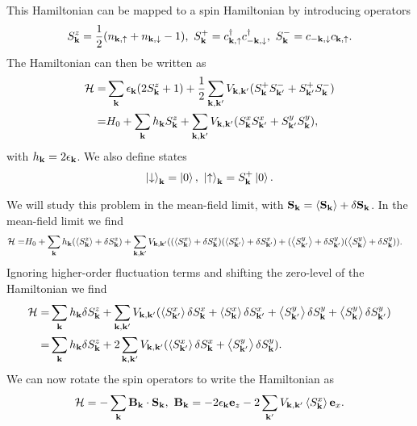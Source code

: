 This Hamiltonian can be mapped to a spin Hamiltonian by introducing operators
\begin{align*}
	S_{\vb{k}}^{z} = \frac{1}{2}(n_{\vb{k}, \uparrow} + n_{\vb{k}, \downarrow} - 1),\ S_{\vb{k}}^{+} = c_{\vb{k}, \uparrow}^{\dagger} c_{-\vb{k}, \downarrow}^{\dagger},\ S_{\vb{k}}^{-} = c_{-\vb{k}, \downarrow}c_{\vb{k}, \uparrow}.
\end{align*}
The Hamiltonian can then be written as
\begin{align*}
	\mathcal{H} =& \sum\limits_{\vb{k}}\epsilon_{\vb{k}}(2S_{\vb{k}}^{z} + 1) + \frac{1}{2}\sum\limits_{\vb{k}, \vb{k}^{\prime}}V_{\vb{k}, \vb{k}^{\prime}}(S_{\vb{k}}^{+}S_{\vb{k}^{\prime}}^{-} + S_{\vb{k}^{\prime}}^{+}S_{\vb{k}}^{-}) \\
	     =& H_{0} + \sum\limits_{\vb{k}}h_{\vb{k}}S_{\vb{k}}^{z} + \sum\limits_{\vb{k}, \vb{k}^{\prime}}V_{\vb{k}, \vb{k}^{\prime}}(S_{\vb{k}}^{x}S_{\vb{k}^{\prime}}^{x} + S_{\vb{k}^{\prime}}^{y}S_{\vb{k}}^{y}),
\end{align*}
with $h_{\vb{k}} = 2\epsilon_{\vb{k}}$. We also define states
\begin{align*}
	\ket{\downarrow}_{\vb{k}} = \ket{0},\ \ket{\uparrow}_{\vb{k}} = S_{\vb{k}}^{+}\ket{0}.
\end{align*}

We will study this problem in the mean-field limit, with $\vb{S}_{\vb{k}} = \expval{\vb{S}_{\vb{k}}} + \delta\vb{S}_{\vb{k}}$. In the mean-field limit we find
\begin{align*}
	\mathcal{H} =& H_{0} + \sum\limits_{\vb{k}}h_{\vb{k}}(\expval{S^{z}_{\vb{k}}} + \delta S^{z}_{\vb{k}}) + \sum\limits_{\vb{k}, \vb{k}^{\prime}}V_{\vb{k}, \vb{k}^{\prime}}((\expval{S^{x}_{\vb{k}}} + \delta S^{x}_{\vb{k}})(\expval{S^{x}_{\vb{k}\ensuremath{^{\prime}}}} + \delta S^{x}_{\vb{k}^{\prime}}) + (\expval{S^{y}_{\vb{k}\ensuremath{^{\prime}}}} + \delta S^{y}_{\vb{k}^{\prime}})(\expval{S^{y}_{\vb{k}}} + \delta S^{y}_{\vb{k}})).
\end{align*}
Ignoring higher-order fluctuation terms and shifting the zero-level of the Hamiltonian we find
\begin{align*}
	\mathcal{H} =& \sum\limits_{\vb{k}}h_{\vb{k}}\delta S^{z}_{\vb{k}} + \sum\limits_{\vb{k}, \vb{k}^{\prime}}V_{\vb{k}, \vb{k}^{\prime}}(\expval{S^{x}_{\vb{k}\ensuremath{^{\prime}}}}\delta S^{x}_{\vb{k}} + \expval{S^{x}_{\vb{k}}}\delta S^{x}_{\vb{k}^{\prime}} + \expval{S^{y}_{\vb{k}\ensuremath{^{\prime}}}}\delta S^{y}_{\vb{k}} + \expval{S^{y}_{\vb{k}}}\delta S^{y}_{\vb{k}^{\prime}}) \\
	     =& \sum\limits_{\vb{k}}h_{\vb{k}}\delta S^{z}_{\vb{k}} + 2\sum\limits_{\vb{k}, \vb{k}^{\prime}}V_{\vb{k}, \vb{k}^{\prime}}(\expval{S^{x}_{\vb{k}\ensuremath{^{\prime}}}}\delta S^{x}_{\vb{k}} + \expval{S^{y}_{\vb{k}\ensuremath{^{\prime}}}}\delta S^{y}_{\vb{k}}).
\end{align*}
We can now rotate the spin operators to write the Hamiltonian as
\begin{align*}
	\ham = -\sum\limits_{\vb{k}}\vb{B}_{\vb{k}}\cdot\vb{S}_{\vb{k}},\ \vb{B}_{\vb{k}} = -2\epsilon_{\vb{k}}\vb{e}_{z} - 2\sum\limits_{\vb{k}\p}V_{\vb{k}, \vb{k}\p}\expval{S_{\vb{k}}^{x}}\vb{e}_{x}.
\end{align*}

